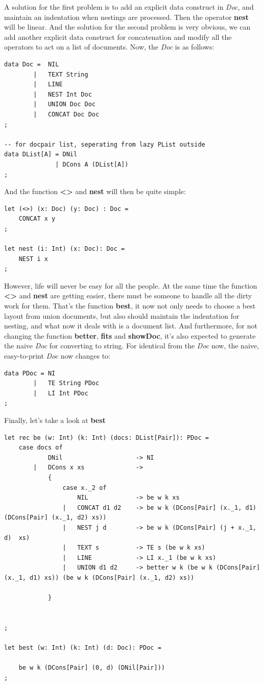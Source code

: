 A solution for the first problem is to add an explicit data construct in \textit{Doc}, and maintain an indentation when nestings are processed. Then the operator \textbf{nest} will be linear. And the solution for the second problem is very obvious, we can add another explicit data construct for concatenation and modify all
the operators to act on a list of documents. Now, the \textit{Doc} is as follows:
\begin{lstlisting}
data Doc =  NIL
        |   TEXT String
        |   LINE
        |   NEST Int Doc
        |   UNION Doc Doc
        |   CONCAT Doc Doc
;

-- for docpair list, seperating from lazy PList outside
data DList[A] = DNil
              | DCons A (DList[A])
;
\end{lstlisting}
And the function \textbf{<>} and \textbf{nest} will then be quite simple:
\begin{lstlisting}
let (<>) (x: Doc) (y: Doc) : Doc =
    CONCAT x y
;

let nest (i: Int) (x: Doc): Doc =
    NEST i x
;
\end{lstlisting}
However, life will never be easy for all the people. At the same time the function \textbf{<>} and \textbf{nest} are getting easier, there must be someone to handle all the dirty work for them. That's the function \textbf{best}, it now not only needs to choose a best layout from union documents, but also should maintain the indentation for nesting, and what now it deals with is a document list. And furthermore, for not changing the function \textbf{better}, \textbf{fits} and \textbf{showDoc}, it's also expected to generate the naive \textit{Doc} for converting to string. For identical from the \textit{Doc} now, the naive, easy-to-print \textit{Doc} now changes to:
\begin{lstlisting}
data PDoc = NI
        |   TE String PDoc
        |   LI Int PDoc
;
\end{lstlisting}
Finally, let's take a look at \textbf{best}


\begin{lstlisting}
let rec be (w: Int) (k: Int) (docs: DList[Pair]): PDoc =
    case docs of
            DNil                    -> NI
        |   DCons x xs              ->
            {
                case x._2 of
                    NIL             -> be w k xs
                |   CONCAT d1 d2    -> be w k (DCons[Pair] (x._1, d1) (DCons[Pair] (x._1, d2) xs))
                |   NEST j d        -> be w k (DCons[Pair] (j + x._1, d)  xs)
                |   TEXT s          -> TE s (be w k xs)
                |   LINE            -> LI x._1 (be w k xs)
                |   UNION d1 d2     -> better w k (be w k (DCons[Pair] (x._1, d1) xs)) (be w k (DCons[Pair] (x._1, d2) xs))

            }


;

let best (w: Int) (k: Int) (d: Doc): PDoc =

    be w k (DCons[Pair] (0, d) (DNil[Pair]))
;
\end{lstlisting}

